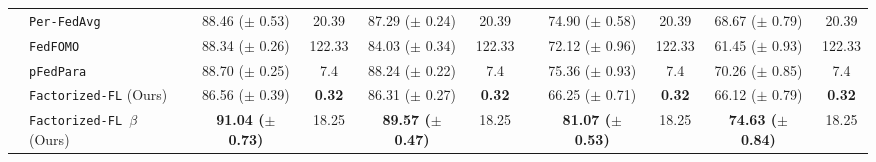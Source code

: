 \begin{table*}[t]
{\begin{tabular}{clccccccccc}
& \texttt{Per-FedAvg}~\citep{fallah2020personalized} & 
{88.46} \scriptsize($\pm$ 0.53) & 20.39 & 
{87.29} \scriptsize($\pm$ 0.24) & 20.39 & 
& 
{74.90} \scriptsize($\pm$ 0.58) & 20.39 &
{68.67} \scriptsize($\pm$ 0.79) & 20.39 \\

& \texttt{FedFOMO}~\citep{zhang2021personalized} & 
{88.34} \scriptsize($\pm$ 0.26) & 122.33 & 
{84.03} \scriptsize($\pm$ 0.34) & 122.33 & 
& 
{72.12} \scriptsize($\pm$ 0.96) & 122.33 &
{61.45} \scriptsize($\pm$ 0.93) & 122.33 \\

& \texttt{pFedPara}~\citep{anonymous2022fedpara} & 
{88.70} \scriptsize($\pm$ 0.25) &  7.4  & 
{88.24} \scriptsize($\pm$ 0.22) &  7.4 &  
& 
{75.36} \scriptsize($\pm$ 0.93) &  7.4 &
{70.26} \scriptsize($\pm$ 0.85) & 7.4  \\

\cmidrule{2-11}
& \texttt{Factorized-FL} (Ours) & 
{86.56} \scriptsize($\pm$ 0.39) &  \textbf{0.32} & 
{86.31} \scriptsize($\pm$ 0.27)  & \textbf{0.32} & 
& 
{66.25} \scriptsize($\pm$ 0.71) & \textbf{0.32} &
{66.12} \scriptsize($\pm$ 0.79)& \textbf{0.32}  \\

& \texttt{Factorized-FL $\beta$} (Ours) & 
\textbf{{91.04} \scriptsize($\pm$ 0.73)} &  18.25 & 
\textbf{{89.57} \scriptsize($\pm$ 0.47)} & 18.25 & 
& 
\textbf{{81.07} \scriptsize($\pm$ 0.53)} & 18.25 &
\textbf{{74.63} \scriptsize($\pm$ 0.84)} & 18.25 \\


\midrule
\bottomrule
\end{tabular}}

\vspace{0.1in}

\end{table*}
